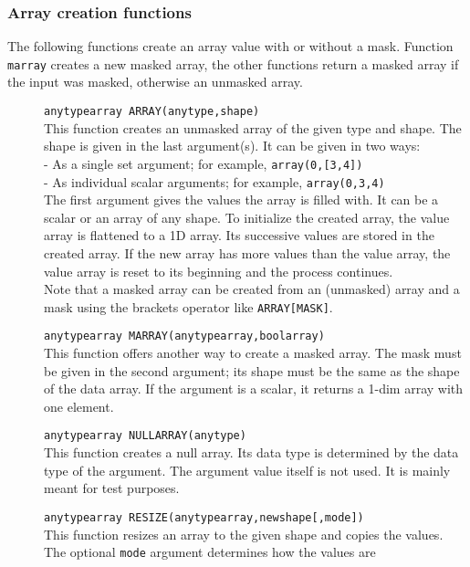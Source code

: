 \subsubsection{Array creation functions}
The following functions create an array value with or without a mask.
Function \texttt{marray} creates a new masked array, the other
functions return a masked array if the input was masked, otherwise an
unmasked array.
\begin{description}
  \item[] \texttt{anytypearray ARRAY(anytype,shape)}\\
    This function creates an unmasked array of the given type and shape.
    The shape is given in the last argument(s).
    It can be given in two ways:
    \\- As a single set argument; for example, \texttt{array(0,[3,4])}
    \\- As individual scalar arguments; for example, \texttt{array(0,3,4)}
    \\The first argument gives the values the array is filled with.
    It can be a scalar or an array of any shape. To initialize the
    created array, the value array is flattened to a 1D array.
    Its successive values are stored in the created array. If the
    new array has more values than the value array, the value array is
    reset to its beginning and the process continues.
    \\Note that a masked array can be created from an (unmasked) array and a mask
    using the brackets operator like \texttt{ARRAY[MASK]}.
  \item[] \texttt{anytypearray MARRAY(anytypearray,boolarray)}\\
    This function offers another way to create a masked array. The
    mask must be given in the second argument; its shape must be the
    same as the shape of the data array.
    If the argument is a scalar, it returns a 1-dim array with one element.
  \item[] \texttt{anytypearray NULLARRAY(anytype)}\\
    This function creates a null array. Its data type is determined by
    the data type of the argument. The argument value itself is not
    used.
    It is mainly meant for test purposes.
  \item[] \texttt{anytypearray RESIZE(anytypearray,newshape[,mode])}\\
    This function resizes an array to the given shape and copies the
    values. The optional \texttt{mode} argument determines how the values are

\end{description}
